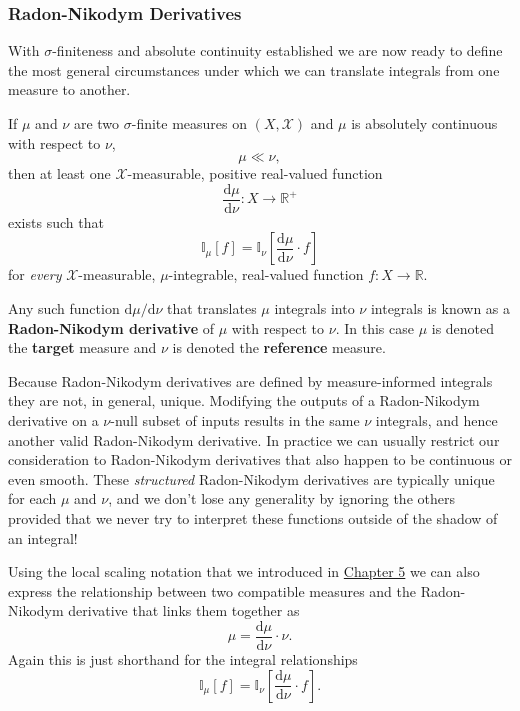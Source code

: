 \documentclass[
  letterpaper,
  DIV=11,
  numbers=noendperiod]{scrartcl}
\begin{document}
\hypertarget{radon-nikodym-derivatives}{%
\subsubsection{Radon-Nikodym
Derivatives}\label{radon-nikodym-derivatives}}

With \(\sigma\)-finiteness and absolute continuity established we are
now ready to define the most general circumstances under which we can
translate integrals from one measure to another.

If \(\mu\) and \(\nu\) are two \(\sigma\)-finite measures on
\((X, \mathcal{X})\) and \(\mu\) is absolutely continuous with respect
to \(\nu\), \[
\mu \ll \nu,
\] then at least one \(\mathcal{X}\)-measurable, positive real-valued
function \[
\frac{ \mathrm{d} \mu }{ \mathrm{d} \nu } : X \rightarrow \mathbb{R}^{+}
\] exists such that \[
\mathbb{I}_{\mu}[f] =
\mathbb{I}_{\nu} \left[
\frac{ \mathrm{d} \mu }{ \mathrm{d} \nu } \cdot f
\right]
\] for \emph{every} \(\mathcal{X}\)-measurable, \(\mu\)-integrable,
real-valued function \(f : X \rightarrow \mathbb{R}\).

Any such function \(\mathrm{d} \mu / \mathrm{d} \nu\) that translates
\(\mu\) integrals into \(\nu\) integrals is known as a
\textbf{Radon-Nikodym derivative} of \(\mu\) with respect to \(\nu\). In
this case \(\mu\) is denoted the \textbf{target} measure and \(\nu\) is
denoted the \textbf{reference} measure.

Because Radon-Nikodym derivatives are defined by measure-informed
integrals they are not, in general, unique. Modifying the outputs of a
Radon-Nikodym derivative on a \(\nu\)-null subset of inputs results in
the same \(\nu\) integrals, and hence another valid Radon-Nikodym
derivative. In practice we can usually restrict our consideration to
Radon-Nikodym derivatives that also happen to be continuous or even
smooth. These \emph{structured} Radon-Nikodym derivatives are typically
unique for each \(\mu\) and \(\nu\), and we don't lose any generality by
ignoring the others provided that we never try to interpret these
functions outside of the shadow of an integral!

Using the local scaling notation that we introduced in
\href{https://betanalpha.github.io/assets/chapters_html/expectation_values.html}{Chapter
5} we can also express the relationship between two compatible measures
and the Radon-Nikodym derivative that links them together as \[
\mu = \frac{ \mathrm{d} \mu }{ \mathrm{d} \nu } \cdot \nu.
\] Again this is just shorthand for the integral relationships \[
\mathbb{I}_{\mu}[f] =
\mathbb{I}_{\nu} \left[
\frac{ \mathrm{d} \mu }{ \mathrm{d} \nu } \cdot f
\right].
\]
\end{document}
